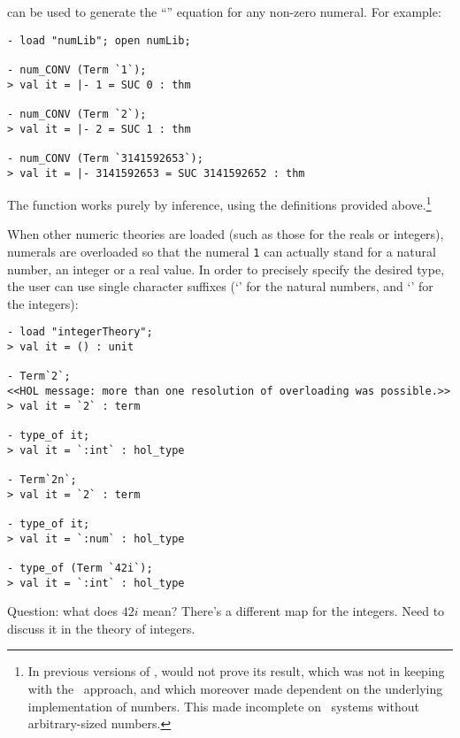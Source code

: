 \noindent {} can be used to generate the ``''
equation for any non-zero numeral.  For example:

\setcounter{sessioncount}{1}
\begin{session}\begin{verbatim}
- load "numLib"; open numLib;

- num_CONV (Term `1`);
> val it = |- 1 = SUC 0 : thm

- num_CONV (Term `2`);
> val it = |- 2 = SUC 1 : thm

- num_CONV (Term `3141592653`);
> val it = |- 3141592653 = SUC 3141592652 : thm
\end{verbatim}\end{session}

\noindent The  function works purely by inference, using
the definitions provided above.\footnote{In previous versions of \HOL,
 would not prove its result, which was not in keeping with
the \LCF\ approach, and which moreover made  dependent on
the underlying implementation of numbers. This made 
incomplete on \ML\ systems without arbitrary-sized numbers.}

When other numeric theories are loaded (such as those for the reals or
integers), numerals are overloaded so that the numeral {\small\verb+1+} can
actually stand for a natural number, an integer or a real value.  In
order to precisely specify the desired type, the user can use single
character suffixes (`' for the natural numbers, and `' for
the integers):

\begin{session}
\begin{verbatim}
- load "integerTheory";
> val it = () : unit

- Term`2`;
<<HOL message: more than one resolution of overloading was possible.>>
> val it = `2` : term

- type_of it;
> val it = `:int` : hol_type

- Term`2n`;
> val it = `2` : term

- type_of it;
> val it = `:num` : hol_type

- type_of (Term `42i`);
> val it = `:int` : hol_type
\end{verbatim}\end{session}

Question: what does $42i$ mean? There's a different map for the
integers. Need to discuss it in the theory of integers.

